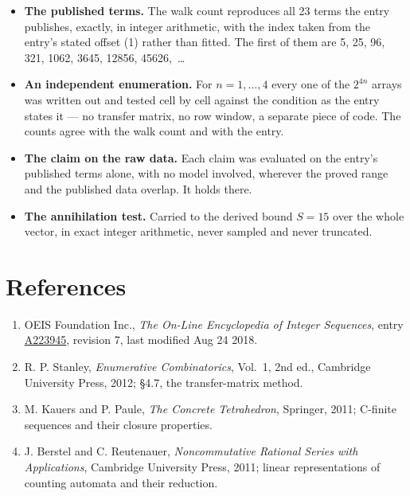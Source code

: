\documentclass[11pt]{article}
\theoremstyle{definition}
\begin{document}
\begin{itemize}

\item {\bfseries The published terms.} The walk count reproduces all 23 terms the entry publishes, exactly, in integer arithmetic, with the index taken from the entry's stated offset (1) rather than fitted. The first of them are 5, 25, 96, 321, 1062, 3645, 12856, 45626,~\dots

\item {\bfseries An independent enumeration.} For $n = 1,\dots,4$ every one of the $2^{4n}$ arrays was written out and tested cell by cell against the condition as the entry states it --- no transfer matrix, no row window, a separate piece of code. The counts agree with the walk count and with the entry.

\item {\bfseries The claim on the raw data.} Each claim was evaluated on the entry's published terms alone, with no model involved, wherever the proved range and the published data overlap. It holds there.

\item {\bfseries The annihilation test.} Carried to the derived bound $S = 15$ over the whole vector, in exact integer arithmetic, never sampled and never truncated.

\end{itemize}

\section{References}

\begin{enumerate}

\item OEIS Foundation Inc., \emph{The On-Line Encyclopedia of Integer Sequences}, entry \href{https://oeis.org/A223945}{A223945}, revision 7, last modified Aug 24 2018.

\item R. P. Stanley, \emph{Enumerative Combinatorics}, Vol.~1, 2nd ed., Cambridge University Press, 2012; \S4.7, the transfer-matrix method.

\item M. Kauers and P. Paule, \emph{The Concrete Tetrahedron}, Springer, 2011; C-finite sequences and their closure properties.

\item J. Berstel and C. Reutenauer, \emph{Noncommutative Rational Series with Applications}, Cambridge University Press, 2011; linear representations of counting automata and their reduction.

\end{enumerate}
\end{document}
